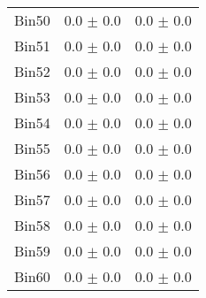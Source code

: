 \begin{tabular}{|c|c|c|}
     Bin50 & 0.0 $\pm$ 0.0 & 0.0 $\pm$ 0.0 \\ \cline{1-3} 
     Bin51 & 0.0 $\pm$ 0.0 & 0.0 $\pm$ 0.0 \\ \cline{1-3} 
     Bin52 & 0.0 $\pm$ 0.0 & 0.0 $\pm$ 0.0 \\ \cline{1-3} 
     Bin53 & 0.0 $\pm$ 0.0 & 0.0 $\pm$ 0.0 \\ \cline{1-3} 
     Bin54 & 0.0 $\pm$ 0.0 & 0.0 $\pm$ 0.0 \\ \cline{1-3} 
     Bin55 & 0.0 $\pm$ 0.0 & 0.0 $\pm$ 0.0 \\ \cline{1-3} 
     Bin56 & 0.0 $\pm$ 0.0 & 0.0 $\pm$ 0.0 \\ \cline{1-3} 
     Bin57 & 0.0 $\pm$ 0.0 & 0.0 $\pm$ 0.0 \\ \cline{1-3} 
     Bin58 & 0.0 $\pm$ 0.0 & 0.0 $\pm$ 0.0 \\ \cline{1-3} 
     Bin59 & 0.0 $\pm$ 0.0 & 0.0 $\pm$ 0.0 \\ \cline{1-3} 
     Bin60 & 0.0 $\pm$ 0.0 & 0.0 $\pm$ 0.0 \\ \cline{1-3} 
  \end{tabular}
